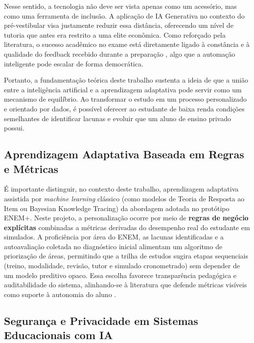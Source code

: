 \documentclass[12pt]{article}
\begin{document}
Nesse sentido, a tecnologia não deve ser vista apenas como um acessório, mas como uma ferramenta de inclusão. A aplicação de IA Generativa no contexto do pré-vestibular visa justamente reduzir essa distância, oferecendo um nível de tutoria que antes era restrito a uma elite econômica. Como reforçado pela literatura, o sucesso acadêmico no exame está diretamente ligado à constância e à qualidade do feedback recebido durante a preparação \cite{latitude2023}, algo que a automação inteligente pode escalar de forma democrática.

Portanto, a fundamentação teórica deste trabalho sustenta a ideia de que a união entre a inteligência artificial e a aprendizagem adaptativa pode servir como um mecanismo de equilíbrio. Ao transformar o estudo em um processo personalizado e orientado por dados, é possível oferecer ao estudante de baixa renda condições semelhantes de identificar lacunas e evoluir que um aluno de ensino privado possui.

\subsection{Aprendizagem Adaptativa Baseada em Regras e Métricas}
\label{sec:adaptativa-regras}

É importante distinguir, no contexto deste trabalho, aprendizagem adaptativa assistida por \textit{machine learning} clássico (como modelos de Teoria de Resposta ao Item ou Bayesian Knowledge Tracing) da abordagem adotada no protótipo ENEM+. Neste projeto, a personalização ocorre por meio de \textbf{regras de negócio explícitas} combinadas a métricas derivadas do desempenho real do estudante em simulados. A proficiência por área do ENEM, as lacunas identificadas e a autoavaliação coletada no diagnóstico inicial alimentam um algoritmo de priorização de áreas, permitindo que a trilha de estudos sugira etapas sequenciais (treino, modalidade, revisão, tutor e simulado cronometrado) sem depender de um modelo preditivo opaco. Essa escolha favorece transparência pedagógica e auditabilidade do sistema, alinhando-se à literatura que defende métricas visíveis como suporte à autonomia do aluno \cite{behar2023,santana2024}.

\subsection{Segurança e Privacidade em Sistemas Educacionais com IA}
\label{sec:seguranca}
\end{document}
